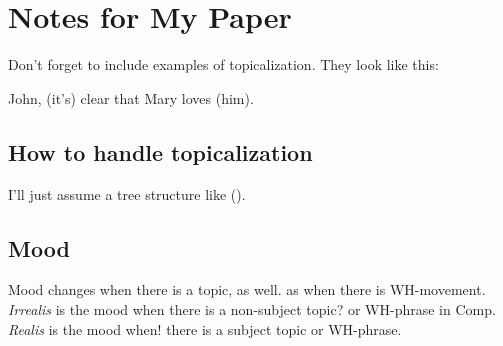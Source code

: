 \documentclass[12pt]{article}
\begin{document}
\section*{Notes for My Paper}

Don't forget to include examples of topicalization.
They look like this:

{\small
{}
{John, (it's) clear that Mary loves (him).
}
}



\subsection*{How to handle topicalization}

I'll just assume a tree structure like ().

{\small
{}
}



\subsection*{Mood}

Mood changes when there is a topic, as well.
as when
there is WH-movement.
 \emph{Irrealis} is the mood when
there is a non-subject topic?
or WH-phrase in Comp.
\emph{Realis} is the mood when!
there is a subject topic
or WH-phrase.
\end{document}
